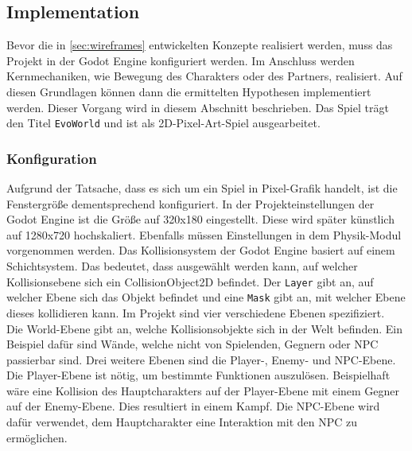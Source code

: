 \subsection{Implementation}
Bevor die in \autoref{sec:wireframes} entwickelten Konzepte realisiert werden, muss das Projekt in der Godot Engine konfiguriert werden.
Im Anschluss werden Kernmechaniken, wie Bewegung des Charakters oder des Partners, realisiert.
Auf diesen Grundlagen können dann die ermittelten Hypothesen implementiert werden.
Dieser Vorgang wird in diesem Abschnitt beschrieben.
Das Spiel trägt den Titel \texttt{EvoWorld} und ist als 2D-Pixel-Art-Spiel ausgearbeitet.

\subsubsection{Konfiguration}
Aufgrund der Tatsache, dass es sich um ein Spiel in Pixel-Grafik handelt, ist die Fenstergröße dementsprechend konfiguriert.
In der Projekteinstellungen der Godot Engine ist die Größe auf 320x180 eingestellt.
Diese wird später künstlich auf 1280x720 hochskaliert.
Ebenfalls müssen Einstellungen in dem Physik-Modul vorgenommen werden.
Das Kollisionsystem der Godot Engine basiert auf einem Schichtsystem\cite{godot-collision}.
Das bedeutet, dass ausgewählt werden kann, auf welcher Kollisionsebene sich ein CollisionObject2D befindet.
Der \texttt{Layer} gibt an, auf welcher Ebene sich das Objekt befindet und eine \texttt{Mask} gibt an, mit welcher Ebene dieses kollidieren kann.
Im Projekt sind vier verschiedene Ebenen spezifiziert.\\

Die World-Ebene gibt an, welche Kollisionsobjekte sich in der Welt befinden.
Ein Beispiel dafür sind Wände, welche nicht von Spielenden, Gegnern oder \ac{NPC} passierbar sind.
Drei weitere Ebenen sind die Player-, Enemy- und \ac{NPC}-Ebene.
Die Player-Ebene ist nötig, um bestimmte Funktionen auszulösen.
Beispielhaft wäre eine Kollision des Hauptcharakters auf der Player-Ebene mit einem Gegner auf der Enemy-Ebene.
Dies resultiert in einem Kampf.
Die \ac{NPC}-Ebene wird dafür verwendet, dem Hauptcharakter eine Interaktion mit den \ac{NPC} zu ermöglichen.

